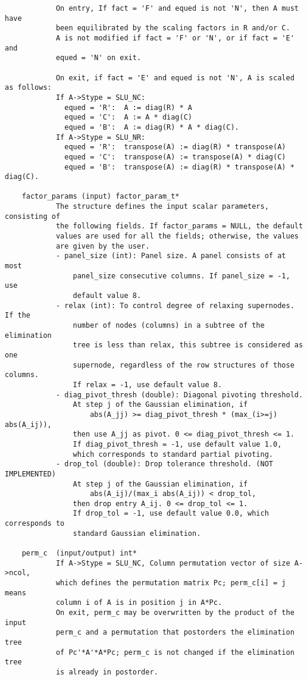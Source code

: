 \begin{verbatim}
            On entry, If fact = 'F' and equed is not 'N', then A must have
            been equilibrated by the scaling factors in R and/or C.  
            A is not modified if fact = 'F' or 'N', or if fact = 'E' and 
            equed = 'N' on exit.
   
            On exit, if fact = 'E' and equed is not 'N', A is scaled as follows:
            If A->Stype = SLU_NC:
              equed = 'R':  A := diag(R) * A
              equed = 'C':  A := A * diag(C)
              equed = 'B':  A := diag(R) * A * diag(C).
            If A->Stype = SLU_NR:
              equed = 'R':  transpose(A) := diag(R) * transpose(A)
              equed = 'C':  transpose(A) := transpose(A) * diag(C)
              equed = 'B':  transpose(A) := diag(R) * transpose(A) * diag(C).
   
    factor_params (input) factor_param_t*
            The structure defines the input scalar parameters, consisting of
            the following fields. If factor_params = NULL, the default
            values are used for all the fields; otherwise, the values
            are given by the user.
            - panel_size (int): Panel size. A panel consists of at most
                panel_size consecutive columns. If panel_size = -1, use 
                default value 8.
            - relax (int): To control degree of relaxing supernodes. If the
                number of nodes (columns) in a subtree of the elimination
                tree is less than relax, this subtree is considered as one
                supernode, regardless of the row structures of those columns.
                If relax = -1, use default value 8.
            - diag_pivot_thresh (double): Diagonal pivoting threshold.
                At step j of the Gaussian elimination, if
                    abs(A_jj) >= diag_pivot_thresh * (max_(i>=j) abs(A_ij)),
                then use A_jj as pivot. 0 <= diag_pivot_thresh <= 1.
                If diag_pivot_thresh = -1, use default value 1.0,
                which corresponds to standard partial pivoting.
            - drop_tol (double): Drop tolerance threshold. (NOT IMPLEMENTED)
                At step j of the Gaussian elimination, if
                    abs(A_ij)/(max_i abs(A_ij)) < drop_tol,
                then drop entry A_ij. 0 <= drop_tol <= 1.
                If drop_tol = -1, use default value 0.0, which corresponds to
                standard Gaussian elimination.
   
    perm_c  (input/output) int*
            If A->Stype = SLU_NC, Column permutation vector of size A->ncol,
            which defines the permutation matrix Pc; perm_c[i] = j means
            column i of A is in position j in A*Pc.
            On exit, perm_c may be overwritten by the product of the input
            perm_c and a permutation that postorders the elimination tree
            of Pc'*A'*A*Pc; perm_c is not changed if the elimination tree
            is already in postorder.
   

\end{verbatim}
